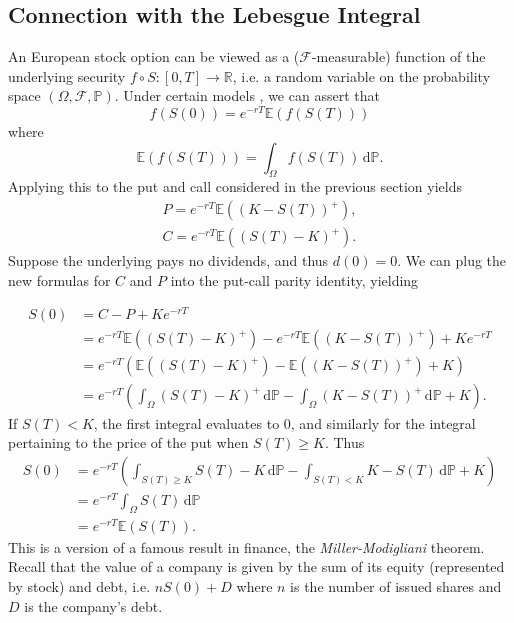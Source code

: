 \documentclass[]{article}
\newcommand{\RR}{\mathbb{R}}
\newcommand{\EE}{\mathbb{E}}
\newcommand{\PP}{\mathbb{P}}
\theoremstyle{definition}
\theoremstyle{remark}
\begin{document}
\subsection{Connection with the Lebesgue Integral}
An European stock option can be viewed as a ($\mathcal{F}$-measurable) function of the underlying security $f \circ S : [0,T] \to \RR$, i.e. a random variable on the probability space $(\Omega, \mathcal{F}, \PP)$. Under certain models \cite{capinski2004measure}, we can assert that
\[
f(S(0)) = e^{-rT} \EE(f(S(T)))
\]
where
\[
\EE(f(S(T))) = \int_\Omega f(S(T))  \, \text{d} \PP.
\]
Applying this to the put and call considered in the previous section yields
\begin{gather*}
	P = e^{-rT} \EE((K - S(T))^+), \\
	C = e^{-rT} \EE((S(T) - K)^+).
\end{gather*}
Suppose the underlying pays no dividends, and thus $d(0)=0$. We can plug the new formulas for $C$ and $P$ into the put-call parity identity, yielding

\begin{align*}
	S(0) &= C - P + Ke^{-rT} \\
	&= e^{-rT} \EE((S(T) - K)^+) - e^{-rT} \EE((K - S(T))^+) + Ke^{-rT} \\
	&= e^{-rT}( \EE((S(T) - K)^+) -  \EE((K - S(T))^+) + K) \\
	&= e^{-rT}  
	\left( \int_\Omega (S(T) - K)^+ \, \text{d} \PP
	- \int_\Omega (K - S(T))^+ \, \text{d}  \PP + K
	\right ).
\end{align*}
If $S(T) < K$, the first integral evaluates to $0$, and similarly for the integral pertaining to the price of the put when $S(T) \geq K$. Thus
\begin{align*}
	S(0) &= e^{-rT}
	\left(
	\int_{S(T) \geq K} S(T)-K \, \text{d} \PP
	-
	\int_{S(T) < K} K - S(T) \, \text{d} \PP + K
	\right) \\
	&= e^{-rT} \int_\Omega S(T) \, \text{d}\PP \\
	&= e^{-rT}\EE(S(T)).
\end{align*}
This is a version of a famous result in finance, the \textit{Miller-Modigliani} theorem. Recall that the value of a company is given by the sum of its equity (represented by stock) and debt, i.e. $n S(0) + D$ where $n$ is the number of issued shares and $D$ is the company's debt. 
\newpage
\nocite{*}

 
\end{document}
